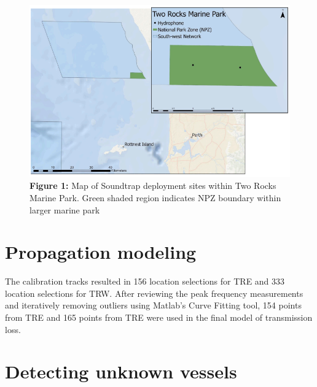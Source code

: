 \documentclass[
  letterpaper,
  oneside,
  open=any]{scrbook}
\begin{document}
\begin{figure}[H]

{\centering \includegraphics{images/Fig.1.PNG}

}

\caption{\textbf{Figure 1:} Map of Soundtrap deployment sites within Two
Rocks Marine Park. Green shaded region indicates NPZ boundary within
larger marine park}

\end{figure}%

\section{Propagation modeling}\label{propagation-modeling}

The calibration tracks resulted in 156 location selections for TRE and
333 location selections for TRW. After reviewing the peak frequency
measurements and iteratively removing outliers using Matlab's Curve
Fitting tool, 154 points from TRE and 165 points from TRE were used in
the final model of transmission loss.

\section{Detecting unknown vessels}\label{detecting-unknown-vessels}
\end{document}
